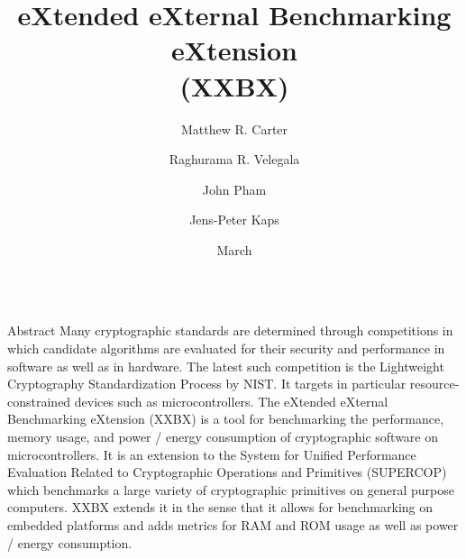 \documentclass[xcolor=pdftex,dvipsnames,table,final]{beamer}
\title{\LARGE eXtended eXternal Benchmarking eXtension\\ \vspace{0.5ex}(XXBX)}
\author{Matthew R. Carter \and Raghurama R. Velegala \and John Pham \and Jens-Peter Kaps}%
\institute{\vspace{-1ex}Department of Electrical and Computer Engineering, George Mason University, Fairfax, Virginia 22030, USA }
\date{March}
\begin{document}
\begin{frame}[fragile]{} 
  \begin{columns}[t, totalwidth=\textwidth]
    \begin{column}{.31\linewidth}

      \begin{block}{Abstract}
Many cryptographic standards are determined through competitions in which 
candidate algorithms are evaluated for their security and performance in software as
well as in hardware. 
The latest such competition is the Lightweight Cryptography Standardization
Process by NIST. 
It targets in particular resource-constrained devices such as 
microcontrollers.
%
The eXtended eXternal Benchmarking eXtension (XXBX) is a tool for benchmarking the performance, 
memory usage, and power / energy consumption of cryptographic software on microcontrollers. 
It is an extension to the System for Unified Performance Evaluation Related to Cryptographic 
Operations and Primitives (SUPERCOP) which benchmarks a large variety of cryptographic primitives 
on general purpose computers. XXBX extends it in the sense that it allows for benchmarking on 
embedded platforms and adds metrics for RAM and ROM usage as well as power / energy consumption. 
      \end{block}


\end{column}
\end{columns}
\end{frame}
\end{document}
